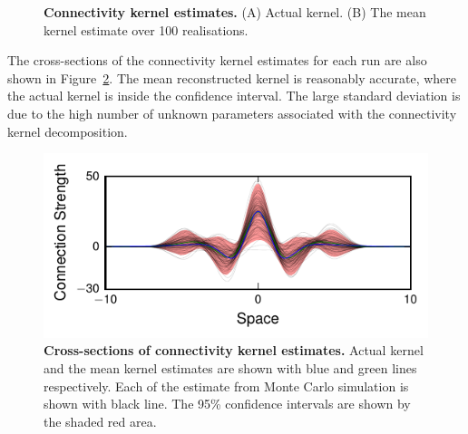\documentclass[]{article}
\begin{document}
\begin{figure}[!ht]
\begin{center}
\end{center}
\caption{{\bf Connectivity kernel estimates.} (A) Actual kernel. (B) The mean kernel estimate over 100 realisations.}
\label{fig:KernelEstimates}
\end{figure}
The cross-sections of the connectivity kernel estimates for each run are also shown in Figure~\ref{fig:KernelEstimateCrossSection}. The mean reconstructed kernel is reasonably accurate, where the actual kernel is inside the confidence interval. The large standard deviation is due to the high number of unknown parameters associated with the connectivity kernel decomposition. 
\begin{figure}[!ht]
\begin{center}
\includegraphics{./Figures/KernelEstimateCrossSection.pdf}
\end{center}
\caption{{\bf Cross-sections of connectivity kernel estimates.} Actual kernel and the mean kernel estimates are shown with blue and green lines respectively. Each of the estimate from Monte Carlo simulation is shown with black line. The 95\% confidence intervals are shown by the shaded red area.}
\label{fig:KernelEstimateCrossSection}
\end{figure}
\end{document}
